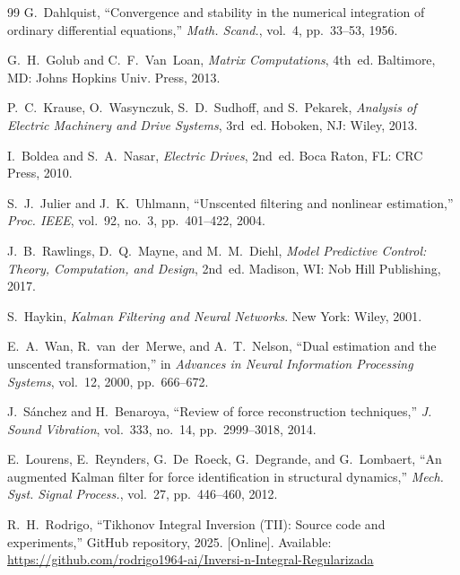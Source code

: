 \documentclass[lettersize,journal]{IEEEtran}
\begin{document}
\begin{thebibliography}{99}
G.~Dahlquist, ``Convergence and stability in the numerical integration of ordinary differential equations,'' \textit{Math. Scand.}, vol.~4, pp.~33--53, 1956.

G.~H.~Golub and C.~F.~Van~Loan, \textit{Matrix Computations}, 4th~ed. Baltimore, MD: Johns Hopkins Univ. Press, 2013.

P.~C.~Krause, O.~Wasynczuk, S.~D.~Sudhoff, and S.~Pekarek, \textit{Analysis of Electric Machinery and Drive Systems}, 3rd~ed. Hoboken, NJ: Wiley, 2013.

I.~Boldea and S.~A.~Nasar, \textit{Electric Drives}, 2nd~ed. Boca Raton, FL: CRC Press, 2010.

S.~J.~Julier and J.~K.~Uhlmann, ``Unscented filtering and nonlinear estimation,'' \textit{Proc. IEEE}, vol.~92, no.~3, pp.~401--422, 2004.

J.~B.~Rawlings, D.~Q.~Mayne, and M.~M.~Diehl, \textit{Model Predictive Control: Theory, Computation, and Design}, 2nd~ed. Madison, WI: Nob Hill Publishing, 2017.

S.~Haykin, \textit{Kalman Filtering and Neural Networks}. New York: Wiley, 2001.

E.~A.~Wan, R.~van~der~Merwe, and A.~T.~Nelson, ``Dual estimation and the unscented transformation,'' in \textit{Advances in Neural Information Processing Systems}, vol.~12, 2000, pp.~666--672.

J.~S\'anchez and H.~Benaroya, ``Review of force reconstruction techniques,'' \textit{J. Sound Vibration}, vol.~333, no.~14, pp.~2999--3018, 2014.

E.~Lourens, E.~Reynders, G.~De~Roeck, G.~Degrande, and G.~Lombaert, ``An augmented Kalman filter for force identification in structural dynamics,'' \textit{Mech. Syst. Signal Process.}, vol.~27, pp.~446--460, 2012.

R.~H.~Rodrigo, ``Tikhonov Integral Inversion (TII): Source code and experiments,'' GitHub repository, 2025. [Online]. Available: \url{https://github.com/rodrigo1964-ai/Inversi-n-Integral-Regularizada}

\end{thebibliography}
\end{document}
